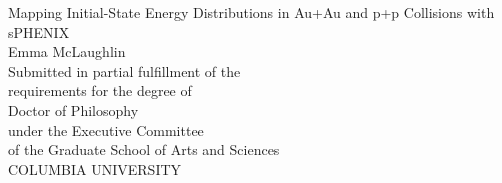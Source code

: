 
\begin{titlepage}
\begin{center}

\begin{singlespacing}
\vspace*{6\baselineskip}
Mapping Initial-State Energy Distributions in Au+Au and p+p Collisions with sPHENIX\\
\vspace{3\baselineskip}
Emma McLaughlin\\
\vspace{18\baselineskip}
Submitted in partial fulfillment of the\\
requirements for the degree of\\
Doctor of Philosophy\\
under the Executive Committee\\
of the Graduate School of Arts and Sciences\\
\vspace{3\baselineskip}
COLUMBIA UNIVERSITY\\
\vspace{3\baselineskip}
\the\year
\vfill


\end{singlespacing}

\end{center}
\end{titlepage}


